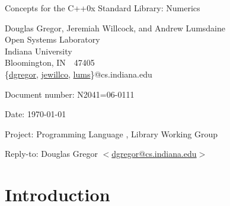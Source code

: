 \documentclass[american,twoside]{book}
\begin{document}
\raggedbottom

\begin{titlepage}
\begin{center}
\huge
Concepts for the C++0x Standard Library: Numerics

\vspace{0.5in}

\normalsize
Douglas Gregor, Jeremiah Willcock, and Andrew Lumsdaine \\
Open Systems Laboratory \\
Indiana University \\
Bloomington, IN\ \  47405 \\
\{\href{mailto:dgregor@cs.indiana.edu}{dgregor}, \href{mailto:jewillco@cs.indiana.edu}{jewillco}, \href{mailto:lums@cs.indiana.edu}{lums}\}@cs.indiana.edu
\end{center}

\vspace{1in}
\par\noindent Document number: N2041=06-0111\vspace{-6pt}
\par\noindent Date: \today\vspace{-6pt}
\par\noindent Project: Programming Language \Cpp{}, Library Working Group\vspace{-6pt}
\par\noindent Reply-to: Douglas Gregor $<$\href{mailto:dgregor@cs.indiana.edu}{dgregor@cs.indiana.edu}$>$\vspace{-6pt}

\section*{Introduction}
\end{titlepage}

\pagestyle{fancy}
\fancyhead[LE,RO]{\textbf{\rightmark}}
\fancyhead[RE]{\textbf{\leftmark\hspace{1em}\thepage}}
\fancyhead[LO]{\textbf{\thepage\hspace{1em}\leftmark}}


\renewcommand{\sectionmark}[1]{\markright{\thesection\hspace{1em}#1}}
\renewcommand{\chaptermark}[1]{\markboth{#1}{}}
\end{document}
